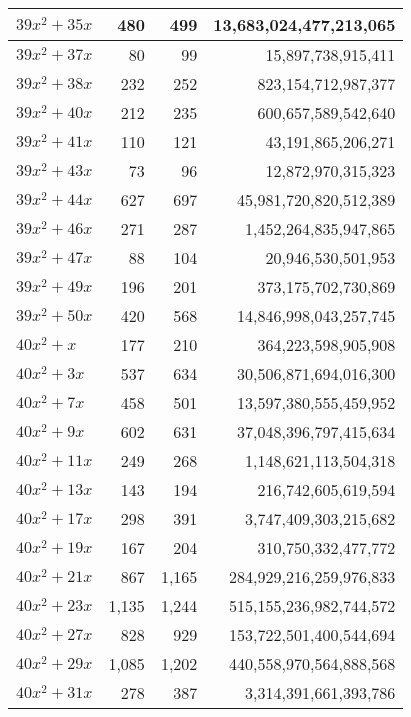 \documentclass[a4paper]{amsproc}
\theoremstyle{plain}
\begin{document}
\begin{longtable}{ | l | r | r | r | }
$39x^2 + 35x$ & 480 & 499 & 13{,}683{,}024{,}477{,}213{,}065 \\ \hline
$39x^2 + 37x$ & 80 & 99 & 15{,}897{,}738{,}915{,}411 \\ \hline
$39x^2 + 38x$ & 232 & 252 & 823{,}154{,}712{,}987{,}377 \\ \hline
$39x^2 + 40x$ & 212 & 235 & 600{,}657{,}589{,}542{,}640 \\ \hline
$39x^2 + 41x$ & 110 & 121 & 43{,}191{,}865{,}206{,}271 \\ \hline
$39x^2 + 43x$ & 73 & 96 & 12{,}872{,}970{,}315{,}323 \\ \hline
$39x^2 + 44x$ & 627 & 697 & 45{,}981{,}720{,}820{,}512{,}389 \\ \hline
$39x^2 + 46x$ & 271 & 287 & 1{,}452{,}264{,}835{,}947{,}865 \\ \hline
$39x^2 + 47x$ & 88 & 104 & 20{,}946{,}530{,}501{,}953 \\ \hline
$39x^2 + 49x$ & 196 & 201 & 373{,}175{,}702{,}730{,}869 \\ \hline
$39x^2 + 50x$ & 420 & 568 & 14{,}846{,}998{,}043{,}257{,}745 \\ \hline
$40x^2 + x$ & 177 & 210 & 364{,}223{,}598{,}905{,}908 \\ \hline
$40x^2 + 3x$ & 537 & 634 & 30{,}506{,}871{,}694{,}016{,}300 \\ \hline
$40x^2 + 7x$ & 458 & 501 & 13{,}597{,}380{,}555{,}459{,}952 \\ \hline
$40x^2 + 9x$ & 602 & 631 & 37{,}048{,}396{,}797{,}415{,}634 \\ \hline
$40x^2 + 11x$ & 249 & 268 & 1{,}148{,}621{,}113{,}504{,}318 \\ \hline
$40x^2 + 13x$ & 143 & 194 & 216{,}742{,}605{,}619{,}594 \\ \hline
$40x^2 + 17x$ & 298 & 391 & 3{,}747{,}409{,}303{,}215{,}682 \\ \hline
$40x^2 + 19x$ & 167 & 204 & 310{,}750{,}332{,}477{,}772 \\ \hline
$40x^2 + 21x$ & 867 & 1{,}165 & 284{,}929{,}216{,}259{,}976{,}833 \\ \hline
$40x^2 + 23x$ & 1{,}135 & 1{,}244 & 515{,}155{,}236{,}982{,}744{,}572 \\ \hline
$40x^2 + 27x$ & 828 & 929 & 153{,}722{,}501{,}400{,}544{,}694 \\ \hline
$40x^2 + 29x$ & 1{,}085 & 1{,}202 & 440{,}558{,}970{,}564{,}888{,}568 \\ \hline
$40x^2 + 31x$ & 278 & 387 & 3{,}314{,}391{,}661{,}393{,}786 \\ \hline

\end{longtable}
\end{document}
